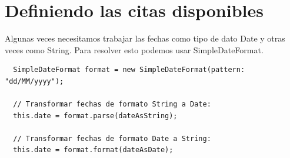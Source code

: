\documentclass{article}
\begin{document}
\section{Definiendo las citas disponibles}%
Algunas veces necesitamos trabajar las fechas como tipo de dato Date y otras
veces como String. Para resolver esto podemos usar SimpleDateFormat.\\

\begin{verbatim}
  SimpleDateFormat format = new SimpleDateFormat(pattern: "dd/MM/yyyy");

  // Transformar fechas de formato String a Date:
  this.date = format.parse(dateAsString);

  // Transformar fechas de formato Date a String:
  this.date = format.format(dateAsDate);
\end{verbatim}
\end{document}
